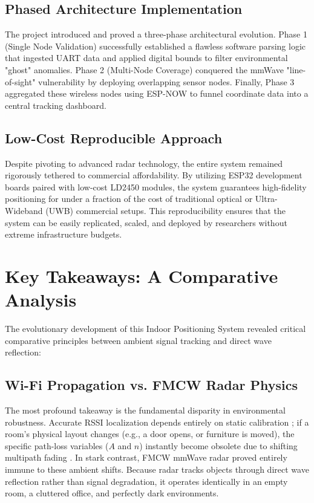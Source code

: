 \subsection{Phased Architecture Implementation}
The project introduced and proved a three-phase architectural evolution. Phase 1 (Single Node Validation) successfully established a flawless software parsing logic that ingested UART data and applied digital bounds to filter environmental "ghost" anomalies. Phase 2 (Multi-Node Coverage) conquered the mmWave "line-of-sight" vulnerability by deploying overlapping sensor nodes. Finally, Phase 3 aggregated these wireless nodes using ESP-NOW to funnel coordinate data into a central tracking dashboard.

\subsection{Low-Cost Reproducible Approach}
Despite pivoting to advanced radar technology, the entire system remained rigorously tethered to commercial affordability. By utilizing ESP32 development boards paired with low-cost LD2450 modules, the system guarantees high-fidelity positioning for under a fraction of the cost of traditional optical or Ultra-Wideband (UWB) commercial setups. This reproducibility ensures that the system can be easily replicated, scaled, and deployed by researchers without extreme infrastructure budgets.

\section{Key Takeaways: A Comparative Analysis}

The evolutionary development of this Indoor Positioning System revealed critical comparative principles between ambient signal tracking and direct wave reflection:

\subsection{Wi-Fi Propagation vs. FMCW Radar Physics}
The most profound takeaway is the fundamental disparity in environmental robustness. Accurate RSSI localization depends entirely on static calibration \cite{rappaport1996wireless}; if a room's physical layout changes (e.g., a door opens, or furniture is moved), the specific path-loss variables ($A$ and $n$) instantly become obsolete due to shifting multipath fading \cite{goldoni2010experimental}. In stark contrast, FMCW mmWave radar proved entirely immune to these ambient shifts. Because radar tracks objects through direct wave reflection rather than signal degradation, it operates identically in an empty room, a cluttered office, and perfectly dark environments.

